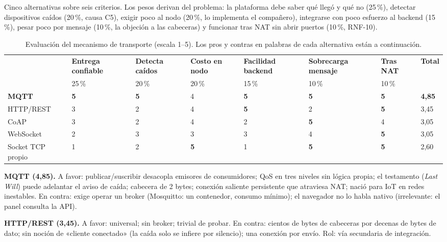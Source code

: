 Cinco alternativas sobre seis criterios. Los pesos derivan del problema: la plataforma debe saber
qué llegó y qué no (25\,\%), detectar dispositivos caídos (20\,\%, causa C5), exigir poco al nodo
(20\,\%, lo implementa el compañero), integrarse con poco esfuerzo al backend (15\,\%), pesar poco
por mensaje (10\,\%, la objeción a las cabeceras) y funcionar tras NAT sin abrir puertos (10\,\%,
RNF-10).

\begin{table}[H]
\centering\footnotesize
\begin{tablaseg}
\begin{tabular}{@{}L{2.7cm}C{1.4cm}C{1.4cm}C{1.3cm}C{1.4cm}C{2.1cm}C{1.1cm}C{1.0cm}@{}}
\toprule
 & \textbf{Entrega confiable} & \textbf{Detecta caídos} & \textbf{Costo en nodo} & \textbf{Facilidad backend} & \textbf{Sobrecarga mensaje} & \textbf{Tras NAT} & \textbf{Total} \\
 & 25\,\% & 20\,\% & 20\,\% & 15\,\% & 10\,\% & 10\,\% & \\
\midrule
\textbf{MQTT} & \textbf{5} & \textbf{5} & 4 & \textbf{5} & \textbf{5} & \textbf{5} & \textbf{4,85} \\
HTTP/REST & 3 & 2 & 4 & \textbf{5} & 2 & \textbf{5} & 3,45 \\
CoAP & 3 & 2 & 4 & 2 & \textbf{5} & 4 & 3,05 \\
WebSocket & 2 & 3 & 3 & 3 & 4 & \textbf{5} & 3,05 \\
Socket TCP propio & 1 & 2 & \textbf{5} & 1 & \textbf{5} & \textbf{5} & 2,60 \\
\bottomrule
\end{tabular}
\end{tablaseg}
\caption{Evaluación del mecanismo de transporte (escala 1--5). Los pros y contras en palabras de
cada alternativa están a continuación.}
\label{tab:transporte}
\end{table}


\textbf{MQTT (4,85).} A favor: publicar/suscribir desacopla emisores de consumidores; QoS en tres
niveles sin lógica propia; el testamento (\emph{Last Will}) puede adelantar el aviso de caída;
cabecera de 2 bytes; conexión saliente persistente que atraviesa NAT; nació para IoT en redes
inestables. En contra: exige operar un broker (Mosquitto: un contenedor, consumo mínimo); el
navegador no lo habla nativo (irrelevante: el panel consulta la API).

\textbf{HTTP/REST (3,45).} A favor: universal; sin broker; trivial de probar. En contra: cientos de
bytes de cabeceras por decenas de bytes de dato; sin noción de «cliente conectado» (la caída solo se
infiere por silencio); una conexión por envío. Rol: vía secundaria de integración.

